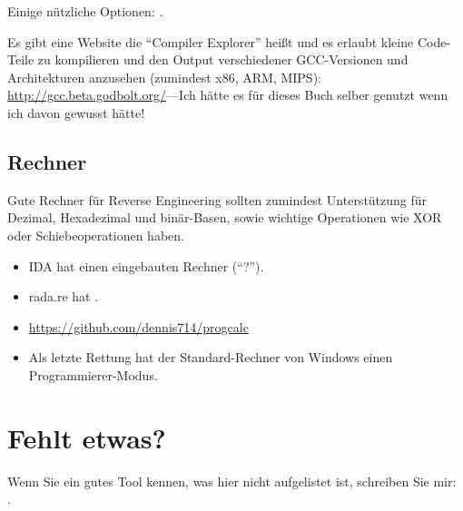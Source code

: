 Einige nützliche Optionen: .

Es gibt eine Website die ``Compiler Explorer'' heißt und es erlaubt kleine Code-Teile zu kompilieren
und den Output verschiedener GCC-Versionen und Architekturen anzusehen (zumindest x86, ARM, MIPS):
\url{http://gcc.beta.godbolt.org/}---Ich hätte es für dieses Buch selber genutzt wenn ich davon gewusst hätte!

\subsection{Rechner}

Gute Rechner für Reverse Engineering sollten zumindest Unterstützung für Dezimal, Hexadezimal und binär-Basen,
sowie wichtige Operationen wie XOR oder Schiebeoperationen haben.

\begin{itemize}

\item IDA hat einen eingebauten Rechner (``?'').

\item rada.re hat .

\item \url{https://github.com/dennis714/progcalc}

\item Als letzte Rettung hat der Standard-Rechner von Windows einen Programmierer-Modus.

\end{itemize}

\section{Fehlt etwas?}

Wenn Sie ein gutes Tool kennen, was hier nicht aufgelistet ist, schreiben Sie mir:\\
\TT{\EMAIL}.
